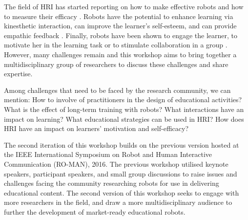 \documentclass{sig-alternate-05-2015}
\begin{document}








The field of HRI has started reporting on how to make 
effective robots and how to measure their efficacy 
\cite{kennedy2016social,tanaka2015pepper}. Robots have the 
potential to enhance learning via kinesthetic interaction, can improve 
the learner's self-esteem, and can provide empathic feedback 
\cite{castellano2013towards,lemaignan2016,tanaka2012children}. Finally, robots have been shown to engage the 
learner, to motivate her in the learning task or to stimulate collaboration in a 
group \cite{park2013providing}. However, many challenges remain and this workshop aims to bring 
together a multidisciplinary group of researchers to discuss these challenges 
and share expertise.

Among challenges that need to be faced by the research community, we can mention: How to involve of practitioners in the design of educational activities? What is the effect of long-term training with robots? What interactions have an impact on learning? What educational strategies can be used in HRI? How does HRI have an impact on learners' motivation and self-efficacy?

The second iteration of this workshop builds on the previous version hosted at 
the IEEE International Symposium on Robot and Human Interactive Communication 
(RO-MAN), 2016. The previous workshop utilised keynote speakers, participant 
speakers, and small group discussions to raise issues and challenges facing the 
community researching robots for use in delivering educational content. The 
second version of this workshop seeks to engage with more researchers in the 
field, and draw a more multidisciplinary audience to further the development of 
market-ready educational robots.
\end{document}
